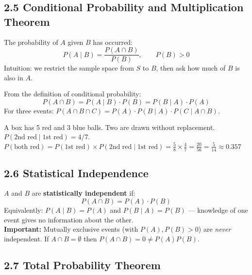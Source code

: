 \documentclass[12pt]{article}
\begin{document}
\subsection{2.5 Conditional Probability and Multiplication Theorem}

\begin{defbox}
The probability of $A$ given $B$ has occurred:
\[P(A\mid B)=\frac{P(A\cap B)}{P(B)}, \qquad P(B)>0\]
Intuition: we restrict the sample space from $S$ to $B$, then ask how much of $B$ is also in $A$.
\end{defbox}

\begin{thmbox}
From the definition of conditional probability:
\[P(A\cap B) = P(A\mid B)\cdot P(B) = P(B\mid A)\cdot P(A)\]
For three events: $P(A\cap B\cap C)=P(A)\cdot P(B\mid A)\cdot P(C\mid A\cap B)$.
\end{thmbox}

\begin{examplebox}
A box has 5 red and 3 blue balls. Two are drawn without replacement.\\[4pt]
$P(\text{2nd red}\mid\text{1st red})=4/7$.\\
$P(\text{both red})=P(\text{1st red})\times P(\text{2nd red}\mid\text{1st red})=\frac{5}{8}\times\frac{4}{7}=\frac{20}{56}=\frac{5}{14}\approx0.357$
\end{examplebox}

\subsection{2.6 Statistical Independence}

\begin{defbox}
$A$ and $B$ are \textbf{statistically independent} if:
\[P(A\cap B)=P(A)\cdot P(B)\]
Equivalently: $P(A\mid B)=P(A)$ and $P(B\mid A)=P(B)$ --- knowledge of one event gives no information about the other.\\[4pt]
\textbf{Important:} Mutually exclusive events (with $P(A),P(B)>0$) are \textit{never} independent. If $A\cap B=\emptyset$ then $P(A\cap B)=0\neq P(A)P(B)$.
\end{defbox}

\subsection{2.7 Total Probability Theorem}
\end{document}
